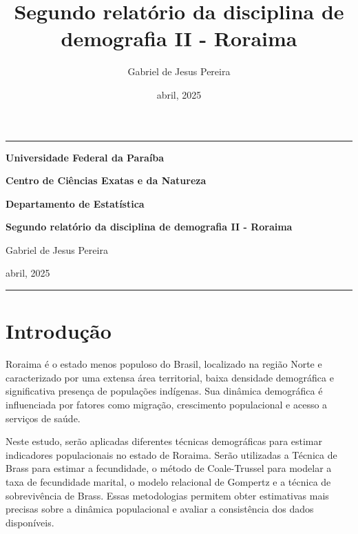 \documentclass[
  12pt,
  a4paper,
]{scrreprt}
\title{Segundo relatório da disciplina de demografia II - Roraima}
\author{Gabriel de Jesus Pereira}
\date{abril, 2025}
\renewcommand*\contentsname{Índice}
\newcommand\contentsname{Índice}
\begin{document}
\cleardoublepage
\thispagestyle{empty}
{\centering
\noindent\rule{\textwidth}{0.5pt}

\vspace{2ex}

{\Large\bfseries Universidade Federal da Paraíba \par}
\vspace{1ex}
{\Large\bfseries Centro de Ciências Exatas e da Natureza \par}
\vspace{1ex}
{\Large\bfseries Departamento de Estatística \par}

\vfill

{\large\bfseries Segundo relatório da disciplina de demografia II -
Roraima \par}

\vfill

{\large Gabriel de Jesus Pereira \par}
\vfill
{\normalsize abril, 2025 \par}


\noindent\rule{\textwidth}{0.5pt}

}
\renewcommand*\contentsname{\centering Sumário \thispagestyle{empty}}
{
\hypersetup{linkcolor=}
\setcounter{tocdepth}{2}
\tableofcontents
}

\pagestyle{fancy}

\fancyhf{}
\fancyhead[RO, LE]{\thepage}
\fancyhead[LO]{\leftmark}
\fancyhead[RE]{\thepage}


\chapter{Introdução}\label{introduuxe7uxe3o}

Roraima é o estado menos populoso do Brasil, localizado na região Norte
e caracterizado por uma extensa área territorial, baixa densidade
demográfica e significativa presença de populações indígenas. Sua
dinâmica demográfica é influenciada por fatores como migração,
crescimento populacional e acesso a serviços de saúde.

\vspace{12pt}

Neste estudo, serão aplicadas diferentes técnicas demográficas para
estimar indicadores populacionais no estado de Roraima. Serão utilizadas
a Técnica de Brass para estimar a fecundidade, o método de Coale-Trussel
para modelar a taxa de fecundidade marital, o modelo relacional de
Gompertz e a técnica de sobrevivência de Brass. Essas metodologias
permitem obter estimativas mais precisas sobre a dinâmica populacional e
avaliar a consistência dos dados disponíveis.
\end{document}
